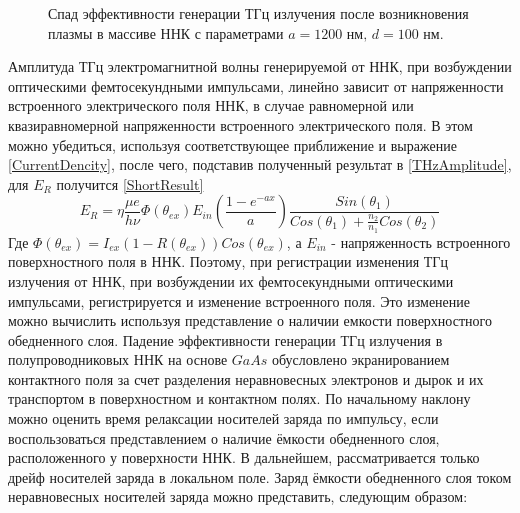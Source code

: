 \documentclass[a4paper,14pt,russian]{extreport}
\begin{document}
				\begin{figure}[H]
					\caption{Спад эффективности генерации ТГц излучения после возникновения плазмы в массиве ННК с параметрами $a = 1200 \text{ нм, } d = 100 \text{ нм}$.}
				\label{ris:short1200100}
				\end{figure}
				Амплитуда ТГц электромагнитной волны генерируемой от ННК, при возбуждении оптическими фемтосекундными импульсами, линейно зависит от напряженности встроенного электрического поля ННК, в случае равномерной или квазиравномерной напряженности встроенного электрического поля. В этом можно убедиться, используя соответствующее приближение и выражение \ref{CurrentDencity}, после чего, подставив полученный результат в \ref{THzAmplitude}, для $E_R$ получится \ref{ShortResult}
				\begin{equation}\label{ShortResult}
					E_R = \eta \frac{\mu e}{h \nu}\Phi(\theta_{ex}) E_{in} \left( \frac{1-e^{-a x}}{a} \right) \frac{Sin(\theta_1)}{Cos(\theta_1)+\frac{n_2}{n_1}Cos(\theta_2)}
				\end{equation}
				Где $\Phi(\theta_{ex}) = I_{ex}(1-R(\theta_{ex}))Cos(\theta_{ex})$, а $E_{in}$ - напряженность встроенного поверхностного поля в ННК. Поэтому, при регистрации изменения ТГц излучения от ННК, при возбуждении их фемтосекундными оптическими импульсами, регистрируется и изменение встроенного поля. Это изменение можно вычислить используя представление о наличии емкости поверхностного обедненного слоя. Падение эффективности генерации ТГц излучения в полупроводниковых ННК на основе $GaAs$ обусловлено экранированием контактного поля за счет разделения неравновесных электронов и дырок и их транспортом в поверхностном и контактном полях. По начальному наклону можно оценить время релаксации носителей заряда по импульсу, если воспользоваться представлением о наличие ёмкости обедненного слоя, расположенного у поверхности ННК. В дальнейшем, рассматривается только дрейф носителей заряда в локальном поле. Заряд ёмкости обедненного слоя током неравновесных носителей заряда можно представить, следующим образом:
\end{document}
